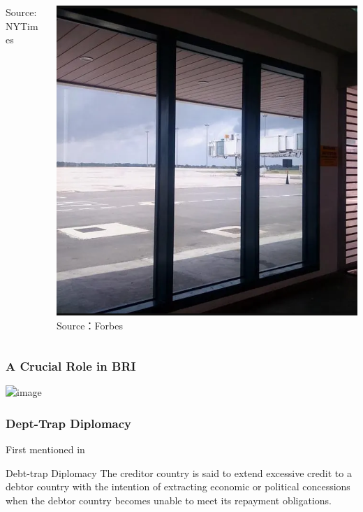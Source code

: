 \documentclass[mathserif]{beamer}
\begin{document}
\begin{frame}
\begin{columns}
\begin{column}{0.4\textwidth}
                    \footnotesize {Source: NYTimes}
            \end{column}%
            \pause%
            \begin{column}{0.4\textwidth}
                    \includegraphics[width = \textwidth]{fig/empty_airport.png}
                    \footnotesize {Source：Forbes}
            \end{column}
        \end{columns}
    \end{frame}

    \begin{frame}
        \frametitle{A Crucial Role in BRI}
        \includegraphics<1>[width = \textwidth]{fig/BRI.png}%
    \end{frame}

    \begin{frame}
        \frametitle{Dept-Trap Diplomacy}
            First mentioned in \citet{Chellaney_2017}
            \begin{block}{Debt-trap Diplomacy}
               The creditor country is said to extend excessive credit to a debtor country with the intention of extracting economic or political concessions when the debtor country becomes unable to meet its repayment obligations.
            \end{block}
    \end{frame}
\end{document}
